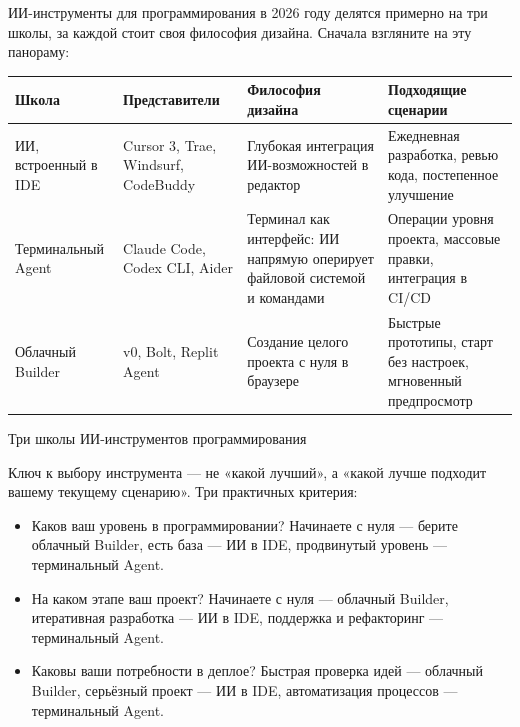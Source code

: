 


ИИ-инструменты для программирования в 2026 году делятся примерно на три школы, за каждой стоит своя философия дизайна. Сначала взгляните на эту панораму:

\begin{center}
\begin{tabularx}{\linewidth}{|X|X|X|X|}
\hline
\textbf{Школа} & \textbf{Представители} & \textbf{Философия дизайна} & \textbf{Подходящие сценарии} \tabularnewline
\hline
ИИ, встроенный в IDE & Cursor 3, Trae, Windsurf, CodeBuddy & Глубокая интеграция ИИ-возможностей в редактор & Ежедневная разработка, ревью кода, постепенное улучшение \tabularnewline
Терминальный Agent & Claude Code, Codex CLI, Aider & Терминал как интерфейс: ИИ напрямую оперирует файловой системой и командами & Операции уровня проекта, массовые правки, интеграция в CI/CD \tabularnewline
Облачный Builder & v0, Bolt, Replit Agent & Создание целого проекта с нуля в браузере & Быстрые прототипы, старт без настроек, мгновенный предпросмотр \tabularnewline
\hline
\end{tabularx}
\end{center}

\begin{center}\small\color{gray}Три школы ИИ-инструментов программирования\end{center}

Ключ к выбору инструмента — не «какой лучший», а «какой лучше подходит вашему текущему сценарию». Три практичных критерия:

\begin{itemize}
  \item Каков ваш уровень в программировании? Начинаете с нуля — берите облачный Builder, есть база — ИИ в IDE, продвинутый уровень — терминальный Agent.
  \item На каком этапе ваш проект? Начинаете с нуля — облачный Builder, итеративная разработка — ИИ в IDE, поддержка и рефакторинг — терминальный Agent.
  \item Каковы ваши потребности в деплое? Быстрая проверка идей — облачный Builder, серьёзный проект — ИИ в IDE, автоматизация процессов — терминальный Agent.
\end{itemize}

